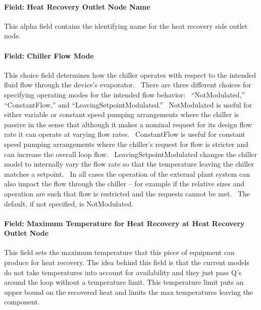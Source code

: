 \paragraph{Field: Heat Recovery Outlet Node Name}\label{field-heat-recovery-outlet-node-name-3}

This alpha field contains the identifying name for the heat recovery side outlet node.

\paragraph{Field: Chiller Flow Mode}\label{field-chiller-flow-mode-5}

This choice field determines how the chiller operates with respect to the intended fluid flow through the device's evaporator.~ There are three different choices for specifying operating modes for the intended flow behavior:~ ``NotModulated,'' ``ConstantFlow,'' and ``LeavingSetpointModulated.''~ NotModulated is useful for either variable or constant speed pumping arrangements where the chiller is passive in the sense that although it makes a nominal request for its design flow rate it can operate at varying flow rates.~ ConstantFlow is useful for constant speed pumping arrangements where the chiller's request for flow is stricter and can increase the overall loop flow.~ LeavingSetpointModulated changes the chiller model to internally vary the flow rate so that the temperature leaving the chiller matches a setpoint.~ In all cases the operation of the external plant system can also impact the flow through the chiller -- for example if the relative sizes and operation are such that flow is restricted and the requests cannot be met.~ The default, if not specified, is NotModulated.

\paragraph{Field: Maximum Temperature for Heat Recovery at Heat Recovery Outlet Node}\label{field-maximum-temperature-for-heat-recovery-at-heat-recovery-outlet-node}

This field sets the maximum temperature that this piece of equipment can produce for heat recovery. The idea behind this field is that the current models do not take temperatures into account for availability and they just pass Q's around the loop without a temperature limit. This temperature limit puts an upper bound on the recovered heat and limits the max temperatures leaving the component.

